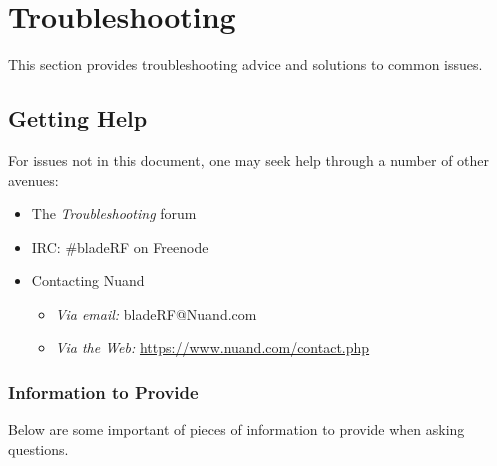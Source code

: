 \section{Troubleshooting} \label{sec:troubleshooting}

This section provides troubleshooting advice and solutions to common issues.

\subsection{Getting Help}\label{sec:help}

For issues not in this document, one may seek help through a number of other
avenues:

{\footnotesize
\begin{itemize}
    \item The \textit{Troubleshooting} forum \cite{TROUBLESHOOTING}
    \item IRC: \#bladeRF on Freenode \cite {FREENODE}
    \item Contacting Nuand
        \begin{itemize}
            \item \textit{Via email:} bladeRF@Nuand.com
            \item \textit{Via the Web:} \url{https://www.nuand.com/contact.php}
        \end{itemize}
\end{itemize}
}

\subsubsection{Information to Provide}
Below are some important of pieces of information to provide when asking
questions.

